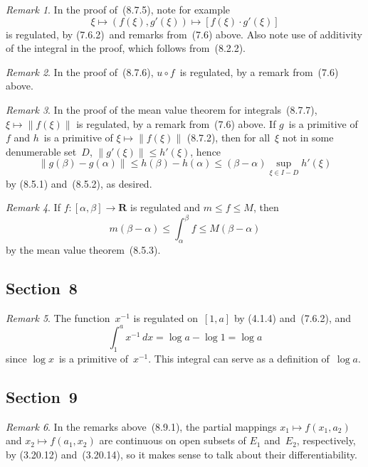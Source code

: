 \documentclass[letterpaper,12pt]{article}
\newcommand{\R}{\mathbf{R}}
\newcommand{\after}{\circ}
\newcommand{\inv}[1]{#1^{-1}}
\newcommand{\norm}[1]{\lVert{#1}\rVert}
\newcommand{\cbprod}[2]{[{#1}\cdot{#2}]}
\renewcommand{\d}[1]{\,d\!{#1}}
\newcommand{\dx}{\d{x}}
\theoremstyle{plain}
\theoremstyle{definition}
\theoremstyle{remark}
\newtheorem*{rmk}{Remark}
\begin{document}
\begin{rmk}
In the proof of~(8.7.5), note for example
\[\xi\mapsto(f(\xi),g'(\xi))\mapsto\cbprod{f(\xi)}{g'(\xi)}\]
is regulated, by (7.6.2)~and remarks from~(7.6) above. Also note use of additivity of the integral in the proof, which follows from~(8.2.2).
\end{rmk}

\begin{rmk}
In the proof of~(8.7.6), \(u\after f\)~is regulated, by a remark from~(7.6) above.
\end{rmk}

\begin{rmk}
In the proof of the mean value theorem for integrals~(8.7.7), \(\xi\mapsto\norm{f(\xi)}\) is regulated, by a remark from~(7.6) above. If \(g\)~is a primitive of~\(f\) and \(h\)~is a primitive of \(\xi\mapsto\norm{f(\xi)}\) (8.7.2), then for all~\(\xi\) not in some denumerable set~\(D\), \(\norm{g'(\xi)}\le h'(\xi)\), hence
\[\norm{g(\beta)-g(\alpha)}\le h(\beta)-h(\alpha)\le(\beta-\alpha)\sup_{\xi\in I-D} h'(\xi)\]
by (8.5.1) and~(8.5.2), as desired.
\end{rmk}

\begin{rmk}
If \(f:[\alpha,\beta]\to\R\) is regulated and \(m\le f\le M\), then
\[m(\beta-\alpha)\le\int_{\alpha}^\beta f\le M(\beta-\alpha)\]
by the mean value theorem~(8.5.3).
\end{rmk}

\subsection*{Section~8}
\begin{rmk}
The function~\(\inv{x}\) is regulated on~\([1,a]\) by (4.1.4) and~(7.6.2), and
\[\int_1^a\inv{x}\dx=\log a-\log 1=\log a\]
since \(\log x\)~is a primitive of~\(\inv{x}\). This integral can serve as a definition of~\(\log a\).
\end{rmk}

\subsection*{Section~9}
\begin{rmk}
In the remarks above~(8.9.1), the partial mappings \(x_1\mapsto f(x_1,a_2)\) and \(x_2\mapsto f(a_1,x_2)\) are continuous on open subsets of \(E_1\) and~\(E_2\), respectively, by (3.20.12) and~(3.20.14), so it makes sense to talk about their differentiability.
\end{rmk}
\end{document}
